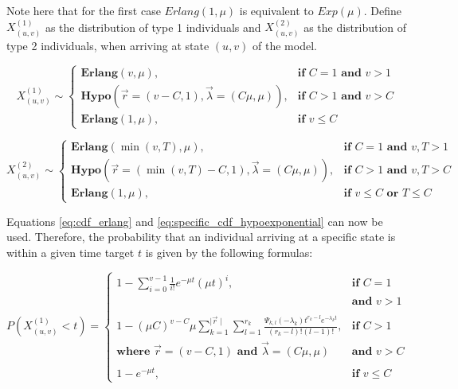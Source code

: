 Note here that for the first case \(Erlang(1, \mu)\) is equivalent to
\(Exp(\mu)\).
Define \(X_{(u,v)}^{(1)}\) as the distribution of type 1 individuals and
\(X_{(u,v)}^{(2)}\) as the distribution of type 2 individuals, when arriving at
state \((u,v)\) of the model.

\small
\begin{equation}
    X_{(u,v)}^{(1)} \sim
    \begin{cases}
        \textbf{Erlang}(v, \mu), & \textbf{if } C = 1 \textbf{ and } v>1 \\
        \textbf{Hypo}\left(\vec{r}=(v - C, 1), \vec{\lambda}=(C \mu, \mu)\right),
            & \textbf{if } C > 1 \textbf{ and } v>C \\
        \textbf{Erlang}(1, \mu), & \textbf{if } v \leq C
    \end{cases}
\end{equation}

\begin{equation}
    X_{(u,v)}^{(2)} \sim
    \begin{cases}
        \textbf{Erlang}(\min(v, T), \mu), & \textbf{if } C = 1
            \textbf{ and } v, T > 1 \\
        \textbf{Hypo}\left(\vec{r}=(\min(v, T) - C, 1), \vec{\lambda}=(C \mu, \mu)\right), &
            \textbf{if } C > 1 \textbf{ and } v, T  > C \\
        \textbf{Erlang}(1, \mu), & \textbf{if } v \leq C \textbf{ or } T \leq C
    \end{cases}
\end{equation}
\normalsize


Equations \ref{eq:cdf_erlang} and \ref{eq:specific_cdf_hypoexponential} can now
be used.
Therefore, the probability that an individual arriving at a specific state is
within a given time target \(t\) is given by the following formulas:


\footnotesize
\begin{equation}
    P(X_{(u,v)}^{(1)} < t) =
    \begin{cases}
        1 - \sum_{i=0}^{v-1} \frac{1}{i!} e^{-\mu t} (\mu t)^i,
            & \textbf{if } C = 1 \\
        & \textbf{and } v > 1 \\
        & \\
        1 - (\mu C)^{v-C} \mu
            \sum_{k=1}^{\mid \vec{r} \mid} \sum_{l=1}^{r_k}
            \frac{\Psi_{k,l}(-\lambda_k)t^{r_k - l}
            e^{-\lambda_k t}}{(r_k - l)! (l - 1)!},
            & \textbf{if } C > 1 \\
        \textbf{where } \vec{r}=(v - C, 1) \textbf{ and }
            \vec{\lambda}=(C \mu, \mu) & \textbf{and } v > C \\
        & \\
        1 - e^{-\mu t},  & \textbf{if } v \leq C
    \end{cases}
\end{equation}

